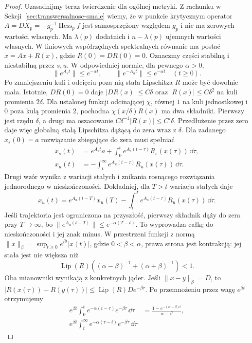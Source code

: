 \begin{proof}
Uzasadnijmy teraz twierdzenie dla ogólnej metryki.
Z rachunku w Sekcji~\ref{sec:transwersalnosc-smale} wiemy, że w punkcie krytycznym operator
$A=DX_p=-g_p^{-1}\operatorname{Hess}_p f$ jest
samosprzężony względem $g_p$ i nie ma zerowych
wartości własnych. Ma $\lambda(p)$ dodatnich
i $n-\lambda(p)$ ujemnych wartości własnych.
W liniowych współrzędnych spektralnych równanie ma postać
$\dot x=Ax+R(x)$, gdzie $R(0)=DR(0)=0$.
Oznaczmy części stabilną i niestabilną przez $s,u$.
W odpowiedniej normie, dla pewnego $\alpha>0$,
\[
 \|e^{A_st}\|\leq e^{-\alpha t},\qquad
 \|e^{-A_ut}\|\leq e^{-\alpha t}\quad(t\geq0).
\]
Po zmniejszeniu kuli i odcięciu poza nią
stała Lipschitza $R$ może być dowolnie mała.
Istotnie, $DR(0)=0$ daje $|DR(x)|\leq C\delta$ oraz
$|R(x)|\leq C\delta^2$ na kuli promienia $2\delta$.
Dla ustalonej funkcji odcinającej $\chi$, równej $1$
na kuli jednostkowej i $0$ poza kulą promienia $2$,
pochodna $\chi(x/\delta)R(x)$ ma dwa składniki.
Pierwszy jest rzędu $\delta$, a drugi ma oszacowanie
$C\delta^{-1}|R(x)|\leq C'\delta$.
Przedłużenie przez zero daje więc globalną stałą Lipschitza
dążącą do zera wraz z $\delta$.
Dla zadanego $x_s(0)=a$ rozwiązanie zbiegające
do zera musi spełniać
\begin{align*}
 x_s(t)&=e^{A_st}a+
       \int_0^t e^{A_s(t-\tau)}R_s(x(\tau))\,\dd\tau,\\
 x_u(t)&=-\int_t^\infty
       e^{A_u(t-\tau)}R_u(x(\tau))\,\dd\tau.
\end{align*}
Drugi wzór wynika z wariacji stałych i znikania
rosnącego rozwiązania jednorodnego w nieskończoności.
Dokładniej, dla $T>t$ wariacja stałych daje
\[
 x_u(t)=e^{A_u(t-T)}x_u(T)
       -\int_t^T e^{A_u(t-\tau)}R_u(x(\tau))\,\dd\tau.
\]
Jeśli trajektoria jest ograniczona na przyszłość,
pierwszy składnik dąży do zera przy $T\to\infty$,
bo $\|e^{A_u(t-T)}\|\leq e^{-\alpha(T-t)}$.
To wyprowadza całkę do nieskończoności i jej znak minus.
W przestrzeni funkcji z normą
$\|x\|_\beta=\sup_{t\geq0}e^{\beta t}|x(t)|$,
gdzie $0<\beta<\alpha$, prawa strona jest kontrakcją:
jej stała jest nie większa niż
\[
 \operatorname{Lip}(R)
 \left((\alpha-\beta)^{-1}+(\alpha+\beta)^{-1}\right)<1.
\]
Oba mianowniki wynikają z konkretnych jąder.
Jeśli $\|x-y\|_\beta=D$, to
$|R(x(\tau))-R(y(\tau))|\leq\operatorname{Lip}(R)D e^{-\beta\tau}$.
Po przemnożeniu przez wagę $e^{\beta t}$ otrzymujemy
\[
 \begin{aligned}
 e^{\beta t}\int_0^t e^{-\alpha(t-\tau)}e^{-\beta\tau}\,\dd\tau
  &=\frac{1-e^{-(\alpha-\beta)t}}{\alpha-\beta},\\
 e^{\beta t}\int_t^\infty e^{-\alpha(\tau-t)}e^{-\beta\tau}\,\dd\tau

\end{aligned}\]
\end{proof}
